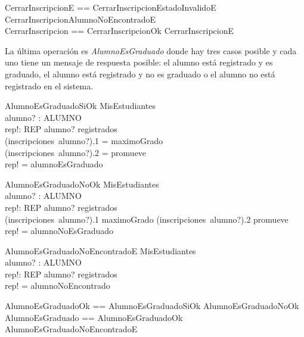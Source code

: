 \documentclass{article}
\begin{document}
\begin{zed}
    CerrarInscripcionE == CerrarInscripcionEstadoInvalidoE \lor CerrarInscripcionAlumnoNoEncontradoE \\
    CerrarInscripcion == CerrarInscripcionOk \lor CerrarInscripcionE
\end{zed}

La última operación es \emph{AlumnoEsGraduado} donde hay tres casos posible y cada uno tiene un mensaje de respuesta posible: el alumno está registrado y es graduado, el alumno está registrado y no es graduado o el alumno no está registrado en el sistema.
\begin{schema}{AlumnoEsGraduadoSiOk}
    \Xi MisEstudiantes \\
    alumno? : ALUMNO \\
    rep!: REP
    \where
    alumno? \in registrados \\
    (inscripciones~alumno?).1 = maximoGrado \\
    (inscripciones~alumno?).2 = promueve \\
    rep! = alumnoEsGraduado
\end{schema}

\begin{schema}{AlumnoEsGraduadoNoOk}
    \Xi MisEstudiantes \\
    alumno? : ALUMNO \\
    rep!: REP
    \where
    alumno? \in registrados \\
    (inscripciones~alumno?).1 \neq maximoGrado \lor (inscripciones~alumno?).2 \neq promueve \\
    rep! = alumnoNoEsGraduado
\end{schema}

\begin{schema}{AlumnoEsGraduadoNoEncontradoE}
    \Xi MisEstudiantes \\
    alumno? : ALUMNO \\
    rep!: REP
    \where
    alumno? \notin registrados \\
    rep! = alumnoNoEncontrado
\end{schema}

\begin{zed}
    AlumnoEsGraduadoOk == AlumnoEsGraduadoSiOk \lor AlumnoEsGraduadoNoOk \\
    AlumnoEsGraduado == AlumnoEsGraduadoOk \lor AlumnoEsGraduadoNoEncontradoE \\
\end{zed}
\end{document}

